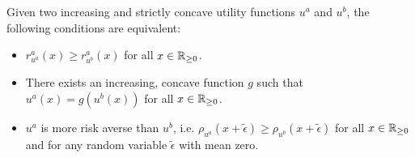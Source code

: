 \documentclass[twoside, titlepage]{article}
\begin{document}
\begin{proposition}[Proposition 2.2] %
    Given two increasing and strictly concave utility functions $u^a$ and $u^b$, the following conditions are equivalent:
    \begin{itemize}
        \item $r^a_{u^a}(x) \geq r^a_{u^b}(x)$ for all $x \in \mathbb{R}_{\geq0}$.
        \item There exists an increasing, concave function $g$ such that $u^a(x) = g(u^b(x))$ for all $x \in \mathbb{R}_{\geq0}$.
        \item $u^a$ is more risk averse than $u^b$, i.e. $\rho_{u^a}(x + \tilde{\epsilon}) \geq \rho_{u^b}(x +\tilde{\epsilon})$ for all $x \in \mathbb{R}_{\geq0}$ and for any random variable $\tilde{\epsilon}$ with mean zero.
    \end{itemize}
\end{proposition}
\end{document}
